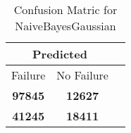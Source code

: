 \begin{table}[] 
\caption{Confusion Matric for NaiveBayesGaussian} 
\label{Table: Prediction Accuracy-NoneNaiveBayesGaussianOnlySunEKF-ignoreReflection100.9EKF-top2-Reflection} 
\centering 
\begin{tabular} 
 {@{}ccc@{}} 
\toprule 
\multicolumn{2}{c}{\textbf{Predicted}}
 \\ \midrule 
\multicolumn{1}{|c|}{Failure} & 
\multicolumn{1}{c|}{No Failure}
 \\ \midrule 
\multicolumn{1}{|c|}{\color{green}\textbf{97845}} & 
\multicolumn{1}{c|}{\color{red}\textbf{12627}}
 \\ \midrule 
\multicolumn{1}{|c|}{\color{red}\textbf{41245}} & 
\multicolumn{1}{c|}{\color{green}\textbf{18411}}
 \\ \bottomrule 
\end{tabular} 
\end{table} 
